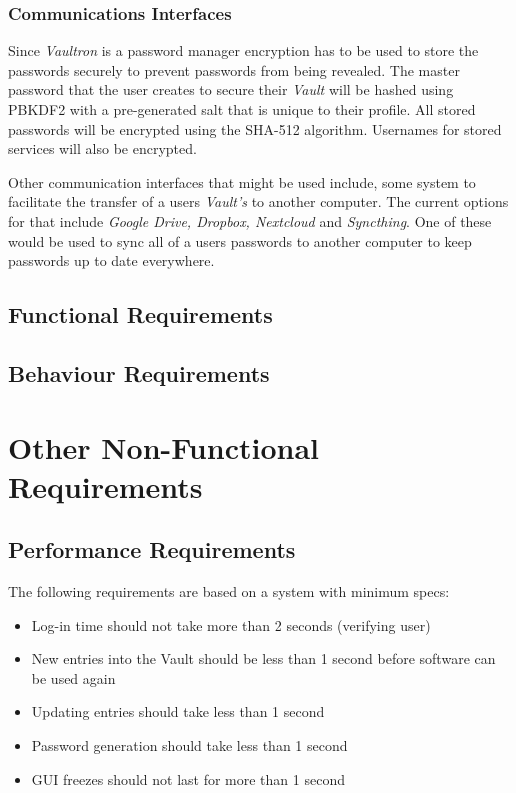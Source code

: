 \documentclass[11pt]{report}
\begin{document}
\subsection{Communications Interfaces}
Since \textit{Vaultron} is a password manager encryption has to be used
to store the passwords securely to prevent passwords from being revealed.
The master password that the user creates to secure their \textit{Vault}
will be hashed using PBKDF2 with a pre-generated salt that is unique to
their profile. All stored passwords will be encrypted using the SHA-512 
algorithm. Usernames for stored services will also be encrypted.


Other communication interfaces that might be used include, some system
to facilitate the transfer of a users \textit{Vault's} to another computer.
The current options for that include \textit{Google Drive, Dropbox, Nextcloud}
and \textit{Syncthing}. One of these would be used to sync all of a users
passwords to another computer to keep passwords up to date everywhere.


\section{Functional Requirements}


\section{Behaviour Requirements}




\chapter{Other Non-Functional Requirements}

\section{Performance Requirements}
The following requirements are based on a system with minimum specs:
\begin{itemize}
    \item Log-in time should not take more than 2 seconds (verifying user)
    \item New entries into the Vault should be less than 1 second before software can be used again
    \item Updating entries should take less than 1 second
    \item Password generation should take less than 1 second
    \item GUI freezes should not last for more than 1 second
\end{itemize}
\end{document}
